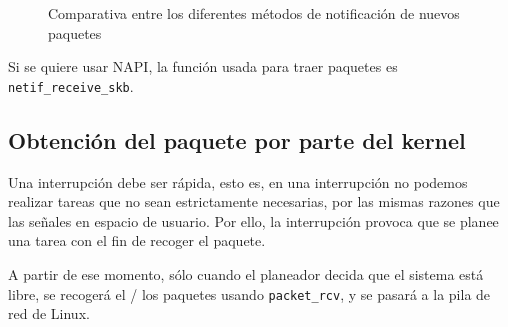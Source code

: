 \begin{figure}[hbtp]
\centering
{}%
\hspace{0.2\textwidth}
%
%
\caption{Comparativa entre los diferentes métodos de notificación de nuevos paquetes}
\end{figure}
%

Si se quiere usar NAPI, la función usada para traer paquetes es \texttt{netif\_receive\_skb}.

\subsection{Obtención del paquete por parte del kernel}
Una interrupción debe ser rápida, esto es, en una interrupción no podemos realizar tareas que no sean estrictamente 
necesarias, por las mismas razones que las señales en espacio de usuario. Por ello, la interrupción provoca que se 
planee una tarea con el fin de recoger el paquete.

A partir de ese momento, sólo cuando el planeador decida que el sistema está libre, se recogerá el / los paquetes 
usando \texttt{packet\_rcv}, y se pasará a la pila de red de Linux.

